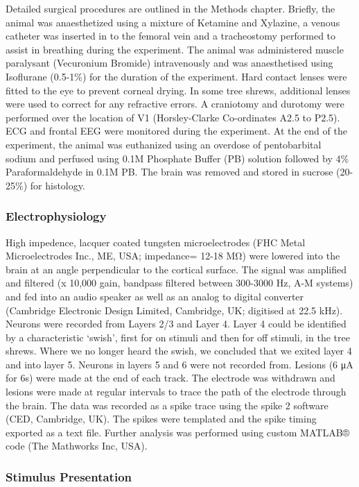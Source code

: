 Detailed surgical procedures are outlined in the Methods chapter.
Briefly, the animal was anaesthetized using a mixture of Ketamine and
Xylazine, a venous catheter was inserted in to the femoral vein and a
tracheostomy performed to assist in breathing during the experiment. The
animal was administered muscle paralysant (Vecuronium Bromide)
intravenously and was anaesthetised using Isoflurane (0.5-1\%) for the
duration of the experiment. Hard contact lenses were fitted to the eye
to prevent corneal drying. In some tree shrews, additional lenses were
used to correct for any refractive errors. A craniotomy and durotomy
were performed over the location of V1 (Horsley-Clarke Co-ordinates A2.5
to P2.5). ECG and frontal EEG were monitored during the experiment. At
the end of the experiment, the animal was euthanized using an overdose
of pentobarbital sodium and perfused using 0.1M Phosphate Buffer (PB)
solution followed by 4\% Paraformaldehyde in 0.1M PB. The brain was
removed and stored in sucrose (20-25\%) for histology.


\subsubsection{Electrophysiology}

High impedence, lacquer coated tungsten microelectrodes (FHC Metal
Microelectrodes Inc., ME, USA; impedance= 12-18 MΩ) were lowered into
the brain at an angle perpendicular to the cortical surface. The signal
was amplified and filtered (x 10,000 gain, bandpass filtered between
300-3000 Hz, A-M systems) and fed into an audio speaker as well as an
analog to digital converter (Cambridge Electronic Design Limited,
Cambridge, UK; digitised at 22.5 kHz). Neurons were recorded from Layers
2/3 and Layer 4. Layer 4 could be identified by a characteristic
`swish', first for on stimuli and then for off stimuli, in the tree
shrews. Where we no longer heard the swish, we concluded that we exited
layer 4 and into layer 5. Neurons in layers 5 and 6 were not recorded
from. Lesions (6 μA for 6s) were made at the end of each track. The
electrode was withdrawn and lesions were made at regular intervals to
trace the path of the electrode through the brain. The data was recorded
as a spike trace using the spike 2 software (CED, Cambridge, UK). The
spikes were templated and the spike timing exported as a text file.
Further analysis was performed using custom MATLAB® code (The Mathworks
Inc, USA).


\subsubsection{Stimulus Presentation}

